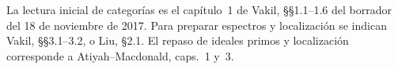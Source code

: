 La lectura inicial de categorías es el capítulo~1 de Vakil, \S\S1.1--1.6 del borrador del 18 de noviembre de 2017. Para preparar espectros y localización se indican Vakil, \S\S3.1--3.2, o Liu, \S2.1. El repaso de ideales primos y localización corresponde a Atiyah--Macdonald, caps.~1 y~3.


